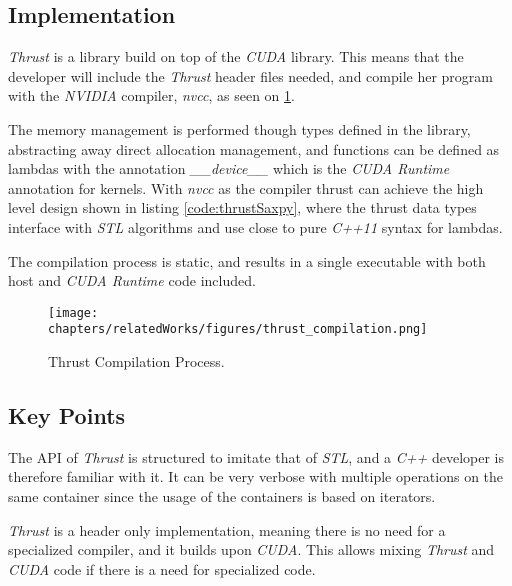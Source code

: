 \subsection{Implementation}
\textit{Thrust} is a library build on top of the \textit{CUDA} library. This means that the developer will include the \textit{Thrust} header files needed, and compile her program with the \textit{NVIDIA} compiler, \textit{nvcc}, as seen on \ref{fig:thrustCompilation}. 

The memory management is performed though types defined in the library, abstracting away direct allocation management, and functions can be defined as lambdas with the annotation \textit{\_\_device\_\_} which is the \textit{CUDA Runtime} annotation for kernels. With \textit{nvcc} as the compiler thrust can achieve the high level design shown in listing \ref{code:thrustSaxpy}, where the thrust data types interface with \textit{STL} algorithms and use close to pure \textit{C++11} syntax for lambdas.

The compilation process is static, and results in a single executable with both host and \textit{CUDA Runtime} code included.
\begin{figure}[H]
\center
\texttt{[image: chapters/relatedWorks/figures/thrust\_compilation.png]}
\caption{Thrust Compilation Process.}
\label{fig:thrustCompilation}
\end{figure}

\subsection{Key Points}
The API of \textit{Thrust} is structured to imitate that of \textit{STL}, and a \textit{C++} developer is therefore familiar with it. It can be very verbose with multiple operations on the same container since the usage of the containers is based on iterators.

\textit{Thrust} is a header only implementation, meaning there is no need for a specialized compiler, and it builds upon \textit{CUDA}. This allows mixing \textit{Thrust} and \textit{CUDA} code if there is a need for specialized code.
